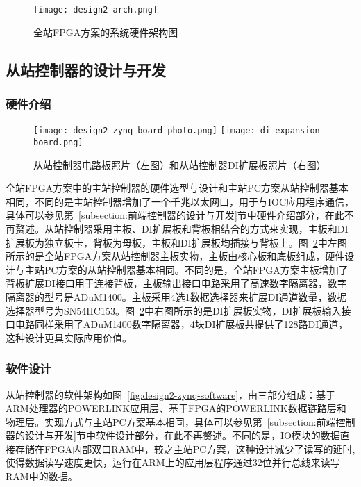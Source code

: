 \begin{figure}[htbp]
  \centering
  \texttt{[image: design2-arch.png]}
  \caption{全站FPGA方案的系统硬件架构图}
  \label{fig:design2-arch}
\end{figure}

\subsection{从站控制器的设计与开发}

\subsubsection{硬件介绍}

\begin{figure}[htb]\centering
  \texttt{[image: design2-zynq-board-photo.png]}  
  \texttt{[image: di-expansion-board.png]}
  \caption{从站控制器电路板照片（左图）和从站控制器DI扩展板照片（右图）}
  \label{fig:design2-zynq-board-photo}
\end{figure}

全站FPGA方案中的主站控制器的硬件选型与设计和主站PC方案从站控制器基本相同，不同的是主站控制器增加了一个千兆以太网口，用于与IOC应用程序通信，具体可以参见第~\ref{subsection:前端控制器的设计与开发}节中硬件介绍部分，在此不再赘述。从站控制器采用主板、DI扩展板和背板相结合的方式来实现，主板和DI扩展板为独立板卡，背板为母板，主板和DI扩展板均插接与背板上。图~\ref{fig:design2-zynq-board-photo}中左图所示的是全站FPGA方案从站控制器主板实物，主板由核心板和底板组成，硬件设计与主站PC方案的从站控制器基本相同。不同的是，全站FPGA方案主板增加了背板扩展DI接口用于连接背板，主板输出接口电路采用了高速数字隔离器，数字隔离器的型号是ADuM1400。主板采用4选1数据选择器来扩展DI通道数量，数据选择器型号为SN54HC153。图~\ref{fig:design2-zynq-board-photo}中右图所示的是DI扩展板实物，DI扩展板输入接口电路同样采用了ADuM1400数字隔离器，4块DI扩展板共提供了128路DI通道，这种设计更具实际应用价值。


\subsubsection{软件设计}

从站控制器的软件架构如图~\ref{fig:design2-zynq-software}，由三部分组成：基于ARM处理器的POWERLINK应用层、基于FPGA的POWERLINK数据链路层和物理层。实现方式与主站PC方案基本相同，具体可以参见第~\ref{subsection:前端控制器的设计与开发}节中软件设计部分，在此不再赘述。不同的是，IO模块的数据直接存储在FPGA内部双口RAM中，较之主站PC方案，这种设计减少了读写的延时,使得数据读写速度更快，运行在ARM上的应用层程序通过32位并行总线来读写RAM中的数据。

